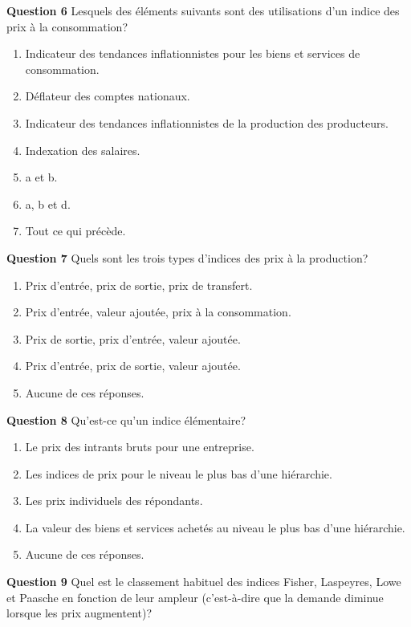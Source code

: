 \documentclass[]{article}
\begin{document}
\textbf{Question 6} Lesquels des éléments suivants sont des utilisations d'un indice des prix à la consommation?

\begin{enumerate}
\def\labelenumi{\alph{enumi})}
\item
  Indicateur des tendances inflationnistes pour les biens et services de consommation.
\item
  Déflateur des comptes nationaux.
\item
  Indicateur des tendances inflationnistes de la production des producteurs.
\item
  Indexation des salaires.
\item
  a et b.
\item
  a, b et d.
\item
  Tout ce qui précède.
\end{enumerate}

\textbf{Question 7} Quels sont les trois types d'indices des prix à la production?

\begin{enumerate}
\def\labelenumi{\alph{enumi})}
\item
  Prix d'entrée, prix de sortie, prix de transfert.
\item
  Prix d'entrée, valeur ajoutée, prix à la consommation.
\item
  Prix de sortie, prix d'entrée, valeur ajoutée.
\item
  Prix d'entrée, prix de sortie, valeur ajoutée.
\item
  Aucune de ces réponses.
\end{enumerate}

\textbf{Question 8} Qu'est-ce qu'un indice élémentaire?

\begin{enumerate}
\def\labelenumi{\alph{enumi})}
\item
  Le prix des intrants bruts pour une entreprise.
\item
  Les indices de prix pour le niveau le plus bas d'une hiérarchie.
\item
  Les prix individuels des répondants.
\item
  La valeur des biens et services achetés au niveau le plus bas d'une hiérarchie.
\item
  Aucune de ces réponses.
\end{enumerate}

\textbf{Question 9} Quel est le classement habituel des indices Fisher, Laspeyres, Lowe et Paasche en fonction de leur ampleur (c'est-à-dire que la demande diminue lorsque les prix augmentent)?
\end{document}
